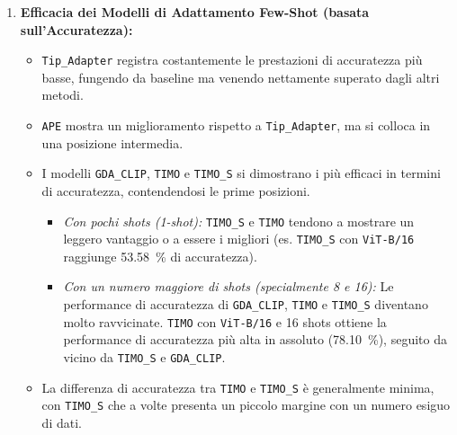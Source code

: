 \documentclass[11pt,a4paper]{article}
\begin{document}
\begin{enumerate}
    \item \textbf{Efficacia dei Modelli di Adattamento Few-Shot (basata sull'Accuratezza):}
    \begin{itemize}[label=\textbullet, leftmargin=*]
        \item \texttt{Tip\_Adapter} registra costantemente le prestazioni di accuratezza più basse, fungendo da baseline ma venendo nettamente superato dagli altri metodi.
        \item \texttt{APE} mostra un miglioramento rispetto a \texttt{Tip\_Adapter}, ma si colloca in una posizione intermedia.
        \item I modelli \texttt{GDA\_CLIP}, \texttt{TIMO} e \texttt{TIMO\_S} si dimostrano i più efficaci in termini di accuratezza, contendendosi le prime posizioni.
            \begin{itemize}[label=\textendash, leftmargin=*]
                \item \textit{Con pochi shots (1-shot):} \texttt{TIMO\_S} e \texttt{TIMO} tendono a mostrare un leggero vantaggio o a essere i migliori (es. \texttt{TIMO\_S} con \texttt{ViT-B/16} raggiunge \SI{53.58}{\percent} di accuratezza).
                \item \textit{Con un numero maggiore di shots (specialmente 8 e 16):} Le performance di accuratezza di \texttt{GDA\_CLIP}, \texttt{TIMO} e \texttt{TIMO\_S} diventano molto ravvicinate. \texttt{TIMO} con \texttt{ViT-B/16} e 16 shots ottiene la performance di accuratezza più alta in assoluto (\SI{78.10}{\percent}), seguito da vicino da \texttt{TIMO\_S} e \texttt{GDA\_CLIP}.
            \end{itemize}
        \item La differenza di accuratezza tra \texttt{TIMO} e \texttt{TIMO\_S} è generalmente minima, con \texttt{TIMO\_S} che a volte presenta un piccolo margine con un numero esiguo di dati.
    \end{itemize}
    

\end{enumerate}
\end{document}
